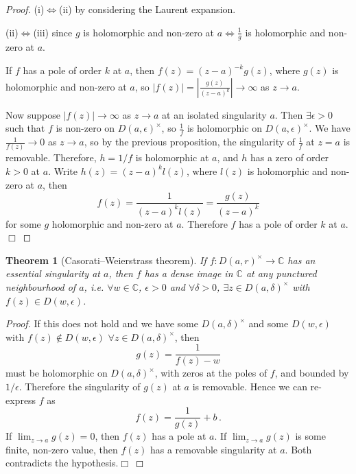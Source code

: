 \documentclass{article}
\theoremstyle{plain}\theoremheaderfont{\normalfont\itshape}\theorembodyfont{\rmfamily}\theoremseparator{.}\newtheorem*{rem}{Remark}\newtheorem*{ex}{Example}\newtheorem*{proof}{Proof}\newtheorem*{altp}{Alternative proof}\newtheorem*{con}{Consequences}\newtheorem*{notn}{Notations}\newtheorem*{cau}{Caution}\newtheorem*{term}{Terminology}\newtheorem*{keyex}{Key example}
\theoremstyle{plain}\theoremheaderfont{\normalfont\bfseries}\theorembodyfont{\rmfamily}\theoremseparator{.}\newtheorem{thm}{Theorem}[section]\newtheorem{lem}[thm]{Lemma}\newtheorem{prop}[thm]{Proposition}\newtheorem*{cor}{Corollary}\newtheorem{defn}[thm]{Definition}\newtheorem{clm}[thm]{Claim}\newtheorem{clminproof}{Claim}\newtheorem{leminproof}{Lemma}\newtheorem{app}{Application}
\theoremstyle{break}\theoremheaderfont{\normalfont\itshape}\theorembodyfont{\rmfamily}\theoremseparator{.\medskip}\newtheorem*{proofskip}{Proof}\newtheorem*{exs}{Examples}\newtheorem*{rems}{Remarks}\newtheorem*{rec}{Recall}\newtheorem*{ppts}{Properties}
\theoremstyle{break}\theoremheaderfont{\normalfont\bfseries}\theorembodyfont{\rmfamily}\theoremseparator{.\medskip}\newtheorem{lemskip}[thm]{Lemma}\newtheorem{defnskip}[thm]{Definition}\newtheorem{propskip}[thm]{Proposition}\newtheorem{thmskip}[thm]{Theorem}
\numberwithin{equation}{section}
\newcommand{\qed}{\hfill\ensuremath{\Box}}
\newcommand{\abs}[1]{\left|#1\right|}
\newcommand{\CC}{\mathbb{C}}
\begin{document}
    \begin{proof}
        (i)\(\Leftrightarrow\)(ii) by considering the Laurent expansion.

        (ii)\(\Leftrightarrow\)(iii) since \(g\) is holomorphic and non-zero at \(a\iff\frac{1}{g}\) is holomorphic and non-zero at \(a\).
        
        If \(f\) has a pole of order \(k\) at \(a\), then \(f(z)=(z-a)^{-k}g(z)\), where \(g(z)\) is holomorphic and non-zero at \(a\), so \(\abs{f(z)}=\abs{\frac{g(z)}{(z-a)^k}}\to\infty\) as \(z\to a\).
        
        Now suppose \(\abs{f(z)}\to\infty\) as \(z\to a\) at an isolated singularity \(a\). Then \(\exists\epsilon>0\) such that \(f\) is non-zero on \(D(a,\epsilon)^\times\), so \(\frac{1}{f}\) is holomorphic on \(D(a,\epsilon)^\times\).  We have \(\frac{1}{f(z)}\to 0\) as \(z\to a\), so by the previous proposition, the singularity of \(\frac{1}{f}\) at \(z=a\) is removable. Therefore, \(h=1/f\) is holomorphic at \(a\), and \(h\) has a zero of order \(k>0\) at \(a\). Write \(h(z)=(z-a)^k l(z)\), where \(l(z)\) is holomorphic and non-zero at \(a\), then
        \[f(z)=\frac{1}{(z-a)^k l(z)}=\frac{g(z)}{(z-a)^k}\]
        for some \(g\) holomorphic and non-zero at \(a\). Therefore \(f\) has a pole of order \(k\) at \(a\).\qed
    \end{proof}
    \begin{thm}[Casorati--Weierstrass theorem]
        If \(f:D(a,r)^\times\to\CC\) has an essential singularity at \(a\), then \(f\) has a dense image in \(\CC\) at any punctured neighbourhood of \(a\), i.e. \(\forall w\in\CC\), \(\epsilon>0\) and \(\forall\delta>0\), \(\exists z\in D(a,\delta)^\times\) with \(f(z)\in D(w,\epsilon)\).
    \end{thm}
    \begin{proof}
        If this does not hold and we have some \(D(a,\delta)^\times\) and some \(D(w,\epsilon)\) with \(f(z)\notin D(w,\epsilon)\) \(\forall z\in D(a,\delta)^\times\), then
        \[g(z)=\frac{1}{f(z)-w}\]
        must be holomorphic on \(D(a,\delta)^\times\), with zeros at the poles of \(f\), and bounded by \(1/\epsilon\). Therefore the singularity of \(g(z)\) at \(a\) is removable. Hence we can re-express \(f\) as
        \[f(z)=\frac{1}{g(z)}+b\,.\]
        If \(\lim_{z\to a}g(z)=0\), then \(f(z)\) has a pole at \(a\). If \(\lim_{z\to a}g(z)\) is some finite, non-zero value, then \(f(z)\) has a removable singularity at \(a\). Both contradicts the hypothesis.\qed
    \end{proof}
\end{document}
